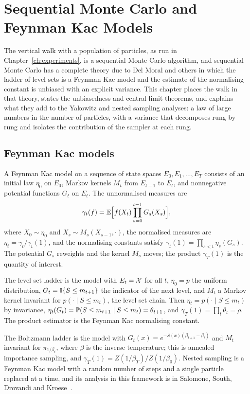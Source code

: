 \chapter{Sequential Monte Carlo and Feynman Kac Models}
\label{ch:smc}

The vertical walk with a population of particles, as run in Chapter~\ref{ch:experiments}, is a sequential Monte Carlo algorithm, and sequential Monte Carlo has a complete theory due to Del Moral and others in which the ladder of level sets is a Feynman Kac model and the estimate of the normalising constant is unbiased with an explicit variance. This chapter places the walk in that theory, states the unbiasedness and central limit theorems, and explains what they add to the Yakowitz and nested sampling analyses: a law of large numbers in the number of particles, with a variance that decomposes rung by rung and isolates the contribution of the sampler at each rung.

\section{Feynman Kac models}

A Feynman Kac model on a sequence of state spaces $E_0, E_1, \dots, E_T$ consists of an initial law $\eta_0$ on $E_0$, Markov kernels $M_t$ from $E_{t-1}$ to $E_t$, and nonnegative potential functions $G_t$ on $E_t$. The unnormalised measures are
\[
\gamma_t(f) = \mathbb{E}\Big[ f(X_t) \prod_{s=0}^{t-1} G_s(X_s) \Big] ,
\]
where $X_0 \sim \eta_0$ and $X_s \sim M_s(X_{s-1}, \cdot)$, the normalised measures are $\eta_t = \gamma_t / \gamma_t(1)$, and the normalising constants satisfy $\gamma_t(1) = \prod_{s < t} \eta_s(G_s)$. The potential $G_s$ reweights and the kernel $M_s$ moves; the product $\gamma_T(1)$ is the quantity of interest.

The level set ladder is the model with $E_t = \mathcal{X}$ for all $t$, $\eta_0 = p$ the uniform distribution, $G_t = \mathbb{I}\{ S \le m_{t+1} \}$ the indicator of the next level, and $M_t$ a Markov kernel invariant for $p(\cdot \mid S \le m_t)$, the level set chain. Then $\eta_t = p(\cdot \mid S \le m_t)$ by invariance, $\eta_t(G_t) = \mathbb{P}(S \le m_{t+1} \mid S \le m_t) = \theta_{t+1}$, and $\gamma_T(1) = \prod_t \theta_t = \rho$. The product estimator is the Feynman Kac normalising constant.

The Boltzmann ladder is the model with $G_t(x) = e^{-S(x)(\beta_{t+1} - \beta_t)}$ and $M_t$ invariant for $\pi_{1/\beta_t}$, where $\beta$ is the inverse temperature; this is annealed importance sampling, and $\gamma_T(1) = Z(1/\beta_T) / Z(1/\beta_0)$. Nested sampling is a Feynman Kac model with a random number of steps and a single particle replaced at a time, and its analysis in this framework is in Salomone, South, Drovandi and Kroese~\cite{Salomone}.


